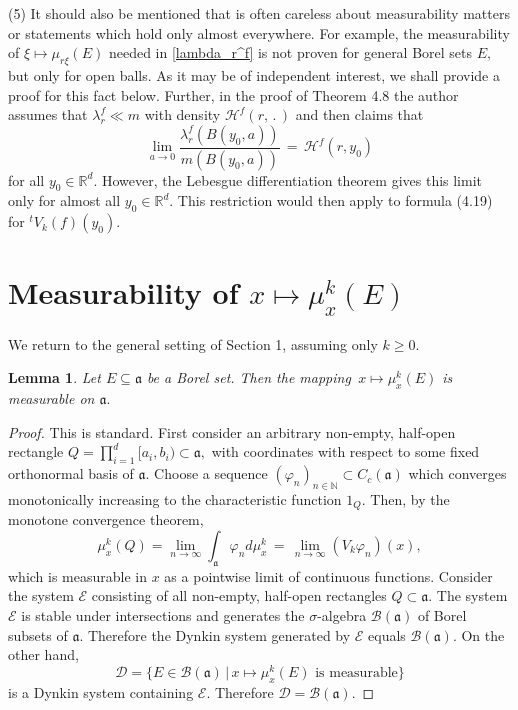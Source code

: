 \documentclass[reqno]{amsart}
\theoremstyle{plain}
\newtheorem{lemma}[theorem]{Lemma}
\theoremstyle{definition}
\theoremstyle{remark}
\numberwithin{equation}{section}
\begin{document}
 \medskip\noindent
 (5) It should also be mentioned that \cite{T10} is often careless about measurability matters or statements which hold only almost everywhere. For example, the measurability of $\xi\mapsto \mu_{r\xi}(E)$ needed in \eqref{lambda_r^f} is not proven for general Borel sets $E,$  but only for open balls. As it may be of independent interest, we shall provide a proof for this fact below. 
 Further, in the proof of Theorem 4.8 the author assumes that $\lambda_r^f \ll m$ with density $\mathcal H^f(r,\,.\,)$ and then claims that
 $$ \lim_{a\to 0} \frac{\lambda_r^f(B(y_0,a))}{m(B(y_0,a))}\,=\, \mathcal H^f(r, y_0)$$
 for all $y_0\in \mathbb R^d.$ However, the Lebesgue differentiation theorem  gives this limit only for almost all $y_0\in \mathbb R^d.$ This restriction would then apply to formula (4.19) for $^tV_k(f)(y_0).$

   \section{Measurability of $x \mapsto \mu_x^k(E)$ } 
   
  \noindent
   We return to the general setting of Section 1, assuming only  $k \geq 0.$
   
 \begin{lemma} 
 Let $E\subseteq  \mathfrak a$ be a Borel set. Then the mapping
 $\, x\mapsto \mu_x^k(E)$ is measurable on $\mathfrak a.$ 
  \end{lemma}
 
 \begin{proof}  This is standard. First consider an arbitrary non-empty, half-open rectangle $Q = \prod_{i=1}^d [a_i, b_i)\subset \mathfrak a,$ with coordinates with respect to some fixed orthonormal basis of $\mathfrak a.$ Choose a sequence $(\varphi_n)_{n\in \mathbb N} \subset C_c(\mathfrak a)$ which converges monotonically increasing to the characteristic function $1_{Q}.$ Then, by the monotone convergence theorem, 
 $$ \mu_x^k(Q) = \lim_{n\to \infty} \int_{\mathfrak a}\varphi_n d\mu_x^k \, = \, \lim_{n\to \infty} (V_k\varphi_n)(x),$$
 which is measurable in $x$ as a pointwise limit of continuous functions. Consider the system
 $ \mathcal E$ consisting of all non-empty, half-open rectangles $Q\subset \mathfrak a.$ The system $\mathcal E$ is stable under intersections and generates the $\sigma$-algebra $\mathcal B(\mathfrak a)$ of Borel subsets of $\mathfrak a$. Therefore the Dynkin system 
 generated by $\mathcal E$ equals $\mathcal B(\mathfrak a).$ On the other hand, 
 $$ \mathcal D= \{E \in \mathcal B(\mathfrak a)\, \vert\, x\mapsto \mu_x^k(E)  \text{ is measurable} \} $$
 is a Dynkin system containing $\mathcal E.$ Therefore $\mathcal D = \mathcal B(\mathfrak a).$ 
  \end{proof}
\end{document}
